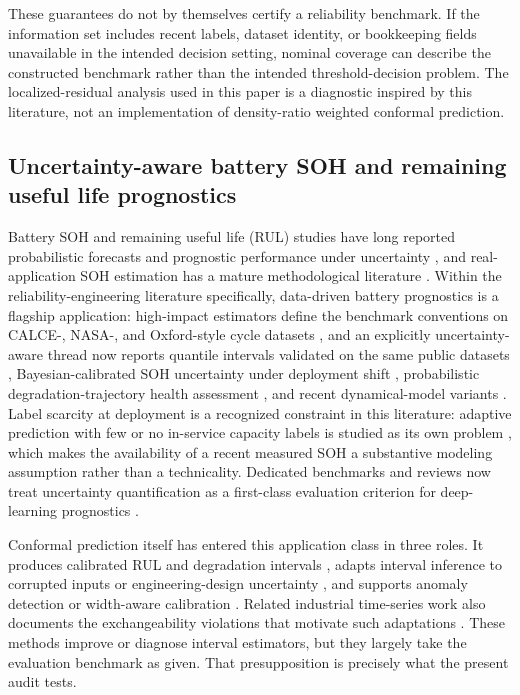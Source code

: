 \documentclass[
  number,
  preprint]{elsarticle}
\begin{document}
These guarantees do not by themselves certify a reliability benchmark.
If the information set includes recent labels, dataset identity, or
bookkeeping fields unavailable in the intended decision setting, nominal
coverage can describe the constructed benchmark rather than the intended
threshold-decision problem. The localized-residual analysis used in this
paper is a diagnostic inspired by this literature, not an implementation
of density-ratio weighted conformal prediction.

\subsection{Uncertainty-aware battery SOH and remaining useful life
prognostics}\label{uncertainty-aware-battery-soh-and-remaining-useful-life-prognostics}

Battery SOH and remaining useful life (RUL) studies have long reported
probabilistic forecasts and prognostic performance under uncertainty
\citep{saxena2010evaluating, he2011remaining, liu2020futurecapacity},
and real-application SOH estimation has a mature methodological
literature \citep{berecibar2016critical}. Within the
reliability-engineering literature specifically, data-driven battery
prognostics is a flagship application: high-impact estimators define the
benchmark conventions on CALCE-, NASA-, and Oxford-style cycle datasets
\citep{wang2023improved, meng2023long, wei2023prediction}, and an
explicitly uncertainty-aware thread now reports quantile intervals
validated on the same public datasets \citep{zhang2024reliability},
Bayesian-calibrated SOH uncertainty under deployment shift
\citep{zhu2025bayesian}, probabilistic degradation-trajectory health
assessment \citep{che2024predictive, lin2023battery}, and recent
dynamical-model variants \citep{wang2025remaining}. Label scarcity at
deployment is a recognized constraint in this literature: adaptive
prediction with few or no in-service capacity labels is studied as its
own problem \citep{zhang2022adaptive, pan2024probabilistic}, which makes
the availability of a recent measured SOH a substantive modeling
assumption rather than a technicality. Dedicated benchmarks and reviews
now treat uncertainty quantification as a first-class evaluation
criterion for deep-learning prognostics
\citep{basora2025benchmark, lin2026recent, nemani2023uncertainty, salinascamus2025comprehensive}.

Conformal prediction itself has entered this application class in three
roles. It produces calibrated RUL and degradation intervals
\citep{xu2026uncertaintyaware, liu2026credible, javanmardi2023conformal, piao2025crulp, soon2026enhancing},
adapts interval inference to corrupted inputs or engineering-design
uncertainty \citep{wang2025robust, wu2026sequential}, and supports
anomaly detection or width-aware calibration
\citep{yuan2026conformal, xu2026widthoptimized}. Related industrial
time-series work also documents the exchangeability violations that
motivate such adaptations \citep{zhang2025uncertainty}. These methods
improve or diagnose interval estimators, but they largely take the
evaluation benchmark as given. That presupposition is precisely what the
present audit tests.
\end{document}
